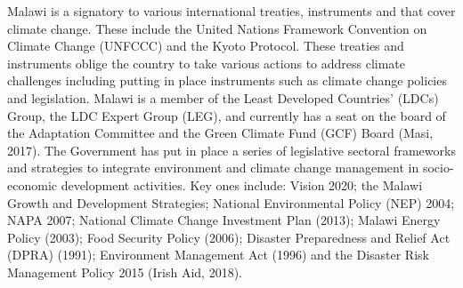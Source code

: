 \documentclass[
]{book}
\begin{document}
Malawi is a signatory to various international treaties, instruments and that cover climate change. These include the United Nations Framework Convention on
Climate Change (UNFCCC) and the Kyoto Protocol. These treaties and instruments oblige the country to take various actions to address climate challenges including
putting in place instruments such as climate change policies and legislation. Malawi is a member of the Least Developed Countries' (LDCs) Group, the LDC Expert
Group (LEG), and currently has a seat on the board of the Adaptation Committee and the Green Climate Fund (GCF) Board (Masi, 2017). The Government has put in
place a series of legislative sectoral frameworks and strategies to integrate environment and climate change management in socio-economic development activities.
Key ones include: Vision 2020; the Malawi Growth and Development Strategies; National Environmental Policy (NEP) 2004; NAPA 2007; National Climate Change
Investment Plan (2013); Malawi Energy Policy (2003); Food Security Policy (2006); Disaster Preparedness and Relief Act (DPRA) (1991); Environment Management Act
(1996) and the Disaster Risk Management Policy 2015 (Irish Aid, 2018).
\end{document}
